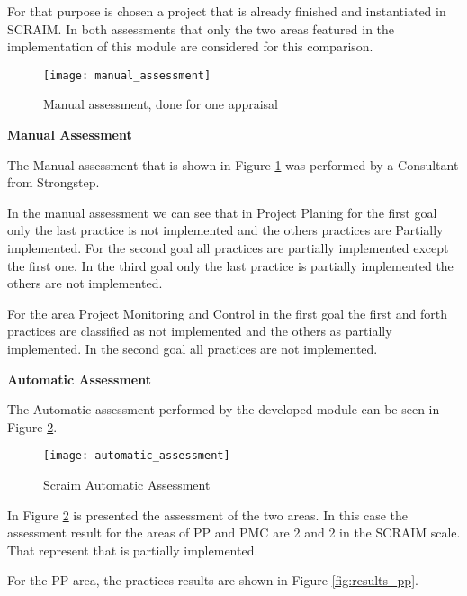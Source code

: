 For that purpose is chosen a project that is already finished and instantiated in SCRAIM.
In both assessments that only the two areas featured in the implementation of this module are considered for this comparison.

\begin{figure}[!htb]
	\begin{center}
		\leavevmode
		\texttt{[image: manual\_assessment]}
		\caption{Manual assessment, done for one appraisal}
		\label{fig:manual_assessment}
	\end{center}
\end{figure}

\textbf{Manual Assessment}

The Manual assessment that is shown in Figure \ref{fig:manual_assessment} was performed by a Consultant from Strongstep.

In the manual assessment we can see that in Project Planing for the first goal only the last practice is not implemented and the others practices are Partially implemented. For the second goal all practices are partially implemented except the first one.
In the third goal only the last practice is partially implemented the others are not implemented.

For the area Project Monitoring and Control in the first goal the first and forth practices are classified as not implemented and the others as partially implemented. In the second goal all practices are not implemented.

\textbf{Automatic Assessment}

The Automatic assessment performed by the developed module can be seen in Figure \ref{fig:automatic_assessment}.

\begin{figure}[!htb]
	\begin{center}
		\leavevmode
		\texttt{[image: automatic\_assessment]}
		\caption{Scraim Automatic Assessment}
		\label{fig:automatic_assessment}
	\end{center}
\end{figure}

In Figure \ref{fig:automatic_assessment} is presented the assessment of the two areas. In this case the assessment result for the areas of PP and PMC are 2 and 2 in the SCRAIM scale. That represent that is partially implemented.

For the PP area, the practices results are shown in Figure \ref{fig:results_pp}.

